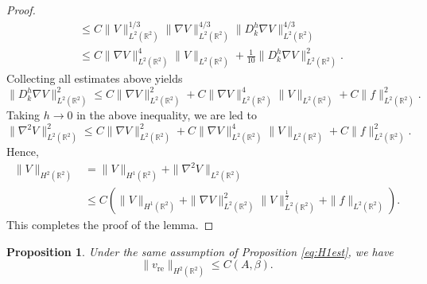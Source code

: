 \documentclass[12pt]{amsart}
\numberwithin{equation}{section}              %
\newtheorem{proposition}{Proposition}[section]
\theoremstyle{remark}
\begin{document}
\begin{proof}
\begin{equation*}
\begin{aligned}
					&\leq C \|V\|_{L^{2}(\mathbb{R}^{2})}^{1/3} \|\nabla V\|_{L^{2}(\mathbb{R}^{2})}^{4/3}  \|D_{k}^{h}\nabla V\|_{L^{2}(\mathbb{R}^{2})}^{4/3} \\
					&\leq C \|\nabla V\|_{L^{2}(\mathbb{R}^{2})}^{4} \| V\|_{L^{2}(\mathbb{R}^{2})} + \frac{1}{10} \|D_{k}^{h}\nabla V\|_{L^{2}(\mathbb{R}^{2})}^{2}.
				\end{aligned}
			\end{equation*}
			Collecting all estimates above yields
			\begin{equation*}
				\|D_{k}^{h}\nabla V\|_{L^{2}(\mathbb{R}^{2})}^{2} \leq C \|\nabla V\|_{L^{2}(\mathbb{R}^{2})}^2 + C \|\nabla V\|_{L^{2}(\mathbb{R}^{2})}^{4} \| V\|_{L^{2}(\mathbb{R}^{2})} + C \|f\|_{L^{2}(\mathbb{R}^{2})}^{2}.
			\end{equation*}
			Taking $h \to 0$ in the above inequality, we are led to
			\begin{equation*}
				\|\nabla^{2}V\|_{L^{2}(\mathbb{R}^{2})}^{2}  \leq C \|\nabla V\|_{L^{2}(\mathbb{R}^{2})}^2 + C \|\nabla V\|_{L^{2}(\mathbb{R}^{2})}^{4} \| V\|_{L^{2}(\mathbb{R}^{2})} + C \|f\|_{L^{2}(\mathbb{R}^{2})}^{2}.
			\end{equation*}
			Hence,
			\begin{equation*}
				\begin{aligned}
					\|V\|_{H^{2}(\mathbb{R}^{2})}  &= 	\|V\|_{H^{1}(\mathbb{R}^{2})}  +  \|\nabla^{2}V\|_{L^{2}(\mathbb{R}^{2})}\\
					&\leq C \left(  \| V\|_{H^{1}(\mathbb{R}^{2})}+  \|\nabla V\|_{L^{2}(\mathbb{R}^{2})}^{2} \| V\|_{L^{2}(\mathbb{R}^{2})}^{\frac{1}{2}} +  \|f\|_{L^{2}(\mathbb{R}^{2})} \right).
				\end{aligned}
			\end{equation*}
			This completes the proof of the lemma. 
		\end{proof}
		
		
		\begin{proposition}\label{pro:H2est}
			Under the same assumption of Proposition \ref{eq:H1est}, 
			we have 
			\begin{equation*}
				\|v_{\text{re}} \|_{H^2(\mathbb{R}^2)}\leq C(A,\beta).
			 \end{equation*}
		\end{proposition}
		
\end{document}
